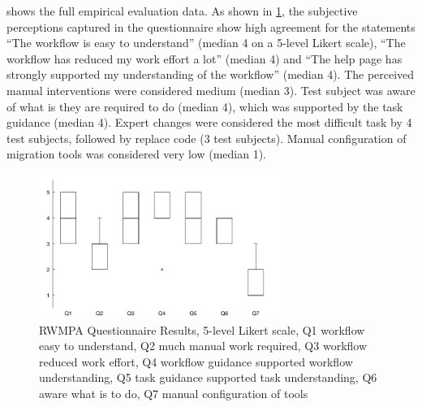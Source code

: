  shows the full empirical evaluation data.
As shown in \cref{fig:rwmpa.boxplot}, the subjective perceptions captured in the questionnaire show high agreement for the statements ``The workflow is easy to understand'' (median 4 on a 5-level Likert scale), ``The workflow has reduced my work effort a lot'' (median 4) and ``The help page has strongly supported my understanding of the workflow'' (median 4).
The perceived manual interventions were considered medium (median 3).
Test subject was aware of what is they are required to do (median 4), which was supported by the task guidance (median 4).
Expert changes were considered the most difficult task by 4 test subjects, followed by replace code (3 test subjects).
Manual configuration of migration tools was considered very low (median 1).


\begin{figure}[h!]
\hypertarget{fig:rwmpa.boxplot}{%
\centering
\includegraphics[width=0.7\textwidth]{../figures/boxplots/rwmpa-boxplot.pdf}
\caption[RWMPA Questionnaire Results]{RWMPA Questionnaire Results, 5-level Likert scale, Q1 workflow easy to understand, Q2 much manual work required, Q3 workflow reduced work effort, Q4 workflow guidance supported workflow understanding, Q5 task guidance supported task understanding, Q6 aware what is to do, Q7 manual configuration of tools}\label{fig:rwmpa.boxplot}
}
\end{figure}

